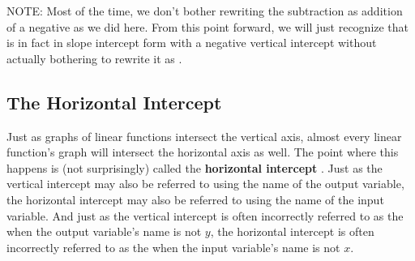 \bigskip

NOTE: Most of the time, we don’t bother rewriting the subtraction as addition of a negative as we did here.  From this point forward, we will just recognize that  is in fact in slope intercept form with a negative vertical intercept without actually bothering to rewrite it as .



%
%

\subsection{The Horizontal Intercept}

Just as graphs of linear functions intersect the vertical axis, almost every linear function’s graph will intersect the horizontal axis as well. The point where this happens is (not surprisingly) called the \textbf{horizontal intercept} . Just as the vertical intercept may also be referred to using the name of the output variable, the horizontal intercept may also be referred to using the name of the input variable. And just as the vertical intercept is often incorrectly referred to as the  when the output variable’s name is not $y$, the horizontal intercept is often incorrectly referred to as the  when the input variable’s name is not $x$.\\

